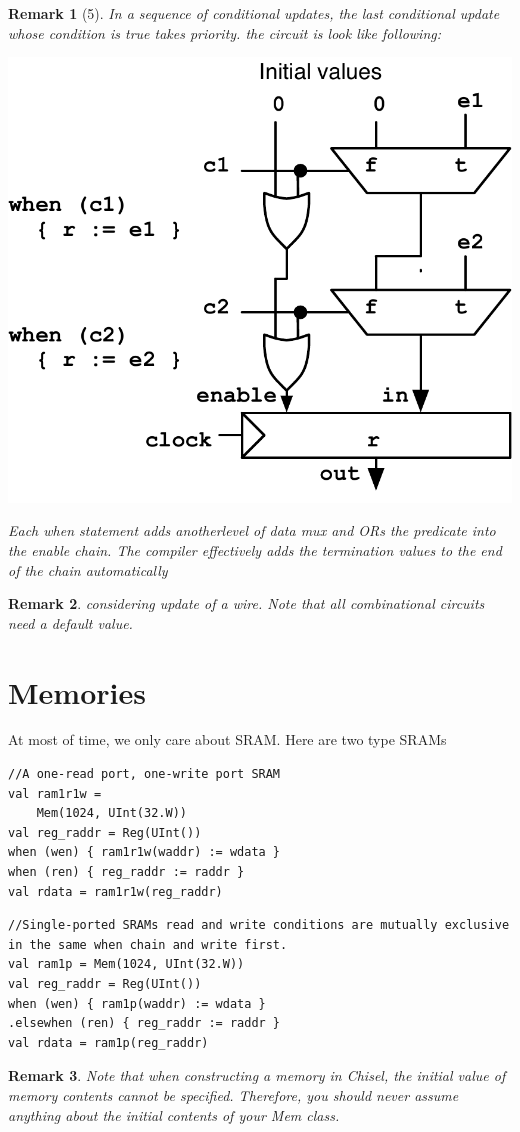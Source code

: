 \documentclass[11pt]{article}
\newtheorem*{remark}{Remark}
\begin{document}
\begin{remark}[5]
	In a sequence of conditional updates, the last conditional update whose condition is true takes priority. the circuit is look like following:
	\begin{center}
		\includegraphics[width=\linewidth/2]{condupdates.pdf}
	\end{center}
	Each when statement adds anotherlevel of data mux and ORs the predicate into the enable chain. The compiler effectively adds the termination values to the end of the chain automatically
\end{remark}
\begin{remark}
	considering update of a wire. Note that all combinational circuits need a default value.
\end{remark}

\section*{Memories}
At most of time, we only care about SRAM. Here are two type SRAMs
\begin{lstlisting}[style = myScalastyle]
//A one-read port, one-write port SRAM
val ram1r1w =
	Mem(1024, UInt(32.W))
val reg_raddr = Reg(UInt())
when (wen) { ram1r1w(waddr) := wdata }
when (ren) { reg_raddr := raddr }
val rdata = ram1r1w(reg_raddr)
\end{lstlisting}
\begin{lstlisting}[style = myScalastyle]
//Single-ported SRAMs read and write conditions are mutually exclusive in the same when chain and write first.
val ram1p = Mem(1024, UInt(32.W))
val reg_raddr = Reg(UInt())
when (wen) { ram1p(waddr) := wdata }
.elsewhen (ren) { reg_raddr := raddr }
val rdata = ram1p(reg_raddr)
\end{lstlisting}
\begin{remark}
	Note that when constructing a memory in Chisel, the initial value of memory contents cannot be specified. Therefore, you should never assume anything about the initial contents of your Mem class.
\end{remark}
\end{document}
